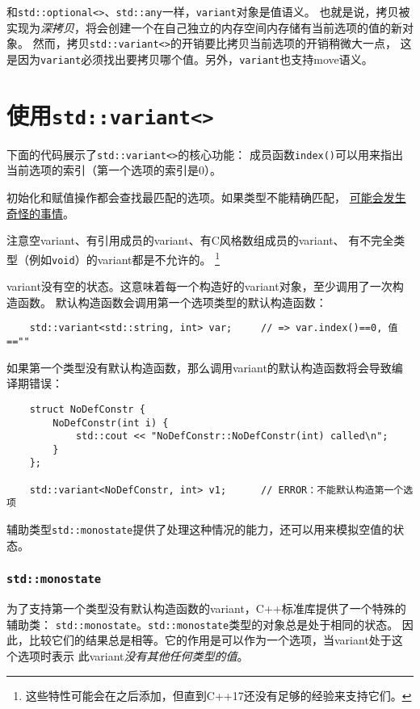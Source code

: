 和\texttt{std::optional<>}、\texttt{std::any}一样，\texttt{variant}对象是值语义。
也就是说，拷贝被实现为\emph{深拷贝}，将会创建一个在自己独立的内存空间内存储有当前选项的值的新对象。
然而，拷贝\texttt{std::variant<>}的开销要比拷贝当前选项的开销稍微大一点，
这是因为\texttt{variant}必须找出要拷贝哪个值。另外，\texttt{variant}也支持move语义。


\section{使用\texttt{std::variant<>}}
下面的代码展示了\texttt{std::variant<>}的核心功能：
成员函数\texttt{index()}可以用来指出当前选项的索引（第一个选项的索引是0）。

初始化和赋值操作都会查找最匹配的选项。如果类型不能精确匹配，
\hyperref[ch16.5]{可能会发生奇怪的事情}。

注意空variant、有引用成员的variant、有C风格数组成员的variant、
有不完全类型（例如\texttt{void}）的variant都是不允许的。
\footnote{这些特性可能会在之后添加，但直到C++17还没有足够的经验来支持它们。}

variant没有空的状态。这意味着每一个构造好的variant对象，至少调用了一次构造函数。
默认构造函数会调用第一个选项类型的默认构造函数：
\begin{lstlisting}
    std::variant<std::string, int> var;     // => var.index()==0, 值==""
\end{lstlisting}
如果第一个类型没有默认构造函数，那么调用variant的默认构造函数将会导致编译期错误：
\begin{lstlisting}
    struct NoDefConstr {
        NoDefConstr(int i) {
            std::cout << "NoDefConstr::NoDefConstr(int) called\n";
        }
    };

    std::variant<NoDefConstr, int> v1;      // ERROR：不能默认构造第一个选项
\end{lstlisting}
辅助类型\texttt{std::monostate}提供了处理这种情况的能力，还可以用来模拟空值的状态。

\subsubsection{\texttt{std::monostate}}\label{ch16.2.1}
为了支持第一个类型没有默认构造函数的variant，C++标准库提供了一个特殊的辅助类：
\texttt{std::monostate}。\texttt{std::monostate}类型的对象总是处于相同的状态。
因此，比较它们的结果总是相等。它的作用是可以作为一个选项，当variant处于这个选项时表示
此variant\emph{没有其他任何类型的值}。

